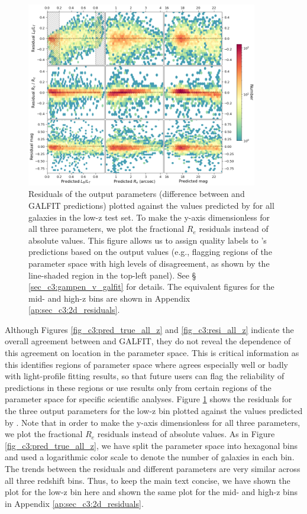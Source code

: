 \begin{figure}[htb]
    \centering
    \includegraphics[width = 0.9\textwidth]{2d_res_low_z.png}
    \caption{Residuals of the output parameters (difference between \gampen{} and GALFIT predictions) plotted against the values predicted by \gampen{} for all galaxies in the low-z test set. To make the y-axis dimensionless for all three parameters, we plot the fractional $R_e$ residuals instead of absolute values. This figure allows us to assign quality labels to \gampen{}'s predictions based on the output values (e.g., flagging regions of the parameter space with high levels of disagreement, as shown by the line-shaded region in the top-left panel). See \S\,\ref{sec_c3:gampen_v_galfit} for details. The equivalent figures for the mid- and high-z bins are shown in Appendix \ref{ap:sec_c3:2d_residuals}.}
    \label{fig_c3:2d_res_low_z}
\end{figure}

Although Figures \ref{fig_c3:pred_true_all_z} and \ref{fig_c3:resi_all_z} indicate the overall agreement between \gampen{} and GALFIT, they do not reveal the dependence of this agreement on location in the parameter space. This is critical information as this identifies regions of parameter space where \gampen{} agrees especially well or badly with light-profile fitting results, so that future users can flag the reliability of predictions in these regions or use results only from certain regions of the parameter space for specific scientific analyses. Figure \ref{fig_c3:2d_res_low_z} shows the residuals for the three output parameters for the low-z bin plotted against the values predicted by \gampen{}. Note that in order to make the y-axis dimensionless for all three parameters, we plot the fractional $R_e$ residuals instead of absolute values. As in Figure \ref{fig_c3:pred_true_all_z},  we have split the parameter space into hexagonal bins and used a logarithmic color scale to denote the number of galaxies in each bin. The trends between the residuals and different parameters are very similar across all three redshift bins. Thus, to keep the main text concise, we have shown the plot for the low-z bin here and shown the same plot for the mid- and high-z bins in Appendix \ref{ap:sec_c3:2d_residuals}.

